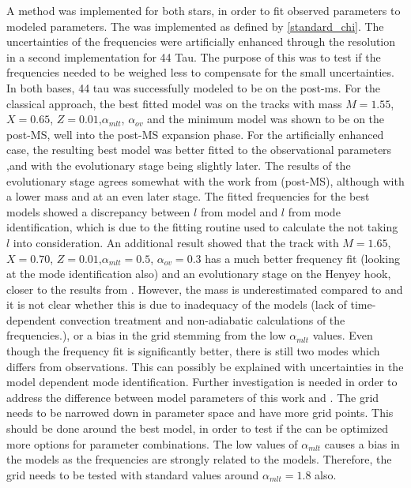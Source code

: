 A \chis method was implemented for both stars, in order to fit observed parameters to modeled parameters.  The \chis was implemented as defined by \eqref{standard_chi}. The uncertainties of the frequencies were artificially enhanced through the resolution in a second \chis implementation for 44 Tau. The purpose of this was to test if the frequencies needed to be weighed less to compensate for the small uncertainties. In both bases, 44 tau was successfully modeled to be on the post-ms. For the classical \chis approach, the best fitted model was on the tracks with mass $M=1.55$\msun, $X=0.65$, $Z=0.01$,$\alpha_{mlt}$, $\alpha_{ov}$ and the minimum \chis model was shown to be on the post-MS,  well into the post-MS expansion phase. For the artificially enhanced case, the resulting best model was better fitted to the observational parameters \teff,\lum and \logg with the evolutionary stage being slightly later. The results of the evolutionary stage agrees somewhat with the work from \citet{lenz2010delta}(post-MS), although with a lower mass and at an even later stage. The fitted frequencies for the best models showed a discrepancy between $l$ from model and $l$ from mode identification, which is due to the fitting routine used to calculate the \chis not taking $l$ into consideration. An additional result showed that the track with $M=1.65$\msun, $X=0.70$, $Z=0.01$,$\alpha_{mlt}= 0.5$, $\alpha_{ov}=0.3$ has a much better frequency fit (looking at the mode identification also) and an evolutionary stage on the Henyey hook, closer to the results from \citet{lenz2010delta}. However, the mass is underestimated compared to \citet{lenz2010delta} and it is not clear whether this is due to inadequacy of the models (lack of time-dependent convection treatment and non-adiabatic calculations of the frequencies.), or a bias in the grid stemming from the low $\alpha_{mlt}$ values. Even though the frequency fit is significantly better, there is still two modes which differs from observations. This can possibly be explained with uncertainties in the model dependent mode identification.  
Further investigation is needed in order to address the difference between model parameters of this work and \citet{lenz2010delta}. The grid needs to be narrowed down in parameter space and have more grid points. This should be done around the best model, in order to test if the \chis can be optimized more options for parameter combinations. The low values of $\alpha_{mlt}$ causes a bias in the models as the frequencies are strongly related to the models. Therefore, the grid needs to be tested with standard values around $\alpha_{mlt}=1.8$ also. 

